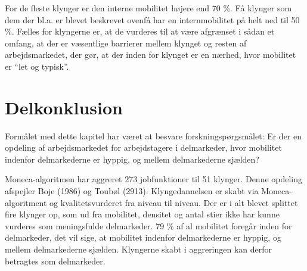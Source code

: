 For de fleste klynger er den interne mobilitet højere end 70 \%. Få klynger som dem der bl.a. er blevet beskrevet ovenfå har en internmobilitet på helt ned til 50 \%. Fælles for klyngerne er, at de vurderes til at være afgrænset i sådan et omfang, at der er væsentlige barrierer mellem klynget og resten af arbejdsmarkedet, der gør, at der inden for klynget er en nærhed, hvor mobilitet er “let og typisk”.


\section{Delkonklusion \label{}}

Formålet med dette kapitel har været at besvare forskningspørgsmålet: Er der en opdeling af arbejdsmarkedet for arbejdstagere i delmarkeder, hvor mobilitet indenfor delmarkederne er hyppig, og mellem delmarkederne sjælden?

Moneca-algoritmen har aggreret 273 jobfunktioner til 51 klynger. Denne opdeling afspejler Boje (1986) og Toubøl (2913). Klyngedannelsen er skabt via Moneca-algoritment og kvalitetsvurderet fra niveau til niveau. Der er i alt blevet splittet fire klynger op, som ud fra mobilitet, densitet og antal stier ikke har kunne vurderes som meningsfulde delmarkeder. 79 \% af al mobilitet foregår inden for delmarkeder, det vil sige, at mobilitet indenfor delmarkederne er hyppig, og mellem delmarkederne sjælden. Klyngerne skabt i aggreringen kan derfor betragtes som delmarkeder.